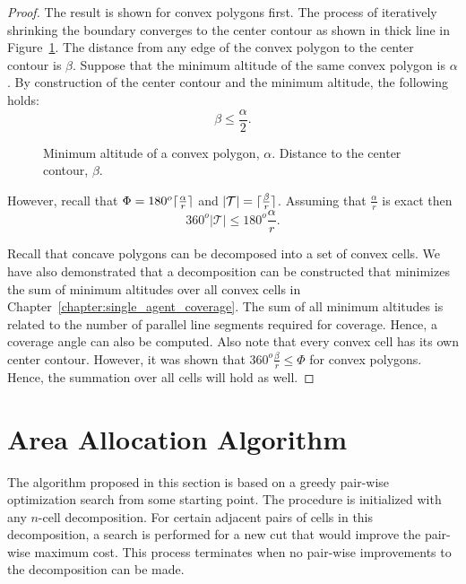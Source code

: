\documentclass[../main.tex]{subfiles}
\begin{document}
\begin{proof}
The result is shown for convex polygons first. The process of iteratively shrinking the boundary converges to the center contour as shown in thick line in Figure~\ref{fig:skeleton_altitude}. The distance from any edge of the convex polygon to the center contour is $\beta$. Suppose that the minimum altitude of the same convex polygon is $\alpha$. By construction of the center contour and the minimum altitude, the following holds:
\begin{equation}
	\beta\leq\frac{\alpha}{2}.
\end{equation}

\begin{figure}
	\centering
	
	\caption{Minimum altitude of a convex polygon, $\alpha$. Distance to the center contour, $\beta$.}
	\label{fig:skeleton_altitude}
\end{figure}

However, recall that $\Phi=180^o\lceil\frac{\alpha}{r}\rceil$ and $|\mathcal{T}|=\lceil\frac{\beta}{r}\rceil$. Assuming that $\frac{\alpha}{r}$ is exact then
\begin{equation}
	360^o|\mathcal{T}|\leq180^o\frac{\alpha}{r}.
\end{equation}

Recall that concave polygons can be decomposed into a set of convex cells. We have also demonstrated that a decomposition can be constructed that minimizes the sum of minimum altitudes over all convex cells in Chapter~\ref{chapter:single_agent_coverage}. The sum of all minimum altitudes is related to the number of parallel line segments required for coverage. Hence, a coverage angle can also be computed. Also note that every convex cell has its own center contour. However, it was shown that $360^o\frac{\beta}{r}\leq\Phi$ for convex polygons. Hence, the summation over all cells will hold as well.
\end{proof}


\section{Area Allocation Algorithm}
\label{section:multi_algorithm}

The algorithm proposed in this section is based on a greedy pair-wise optimization search from some starting point. The procedure is initialized with any $n$-cell decomposition. For certain adjacent pairs of cells in this decomposition, a search is performed for a new cut that would improve the pair-wise maximum cost. This process terminates when no pair-wise improvements to the decomposition can be made. %
\end{document}
